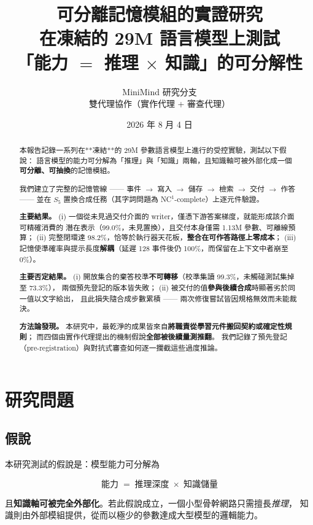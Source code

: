 \documentclass[11pt, a4paper]{article}
\title{\textbf{可分離記憶模組的實證研究}\\[4pt]
\large 在凍結的 29M 語言模型上測試\\
「能力 $=$ 推理 $\times$ 知識」的可分解性}
\author{MiniMind 研究分支\\\small 雙代理協作（實作代理 + 審查代理）}
\date{2026 年 8 月 4 日}
\begin{document}
\maketitle

\begin{abstract}
\noindent
本報告記錄一系列在**凍結**的 29M 參數語言模型上進行的受控實驗，測試以下假說：
語言模型的能力可分解為「推理」與「知識」兩軸，且知識軸可被外部化成一個
\textbf{可分離、可抽換}的記憶模組。

我們建立了完整的記憶管線 —— 事件 $\to$ 寫入 $\to$ 儲存 $\to$ 檢索 $\to$ 交付 $\to$ 作答 ——
並在 $S_5$ 置換合成任務（其字詞問題為 NC$^1$-complete）上逐元件驗證。

\textbf{主要結果。}
(i) 一個從未見過交付介面的 writer，僅憑下游答案梯度，就能形成該介面可精確消費的
潛在表示（99.0\%，未見置換），且交付本身僅需 1.13M 參數、可離線預算；
(ii) 完整閉環達 98.2\%，恰等於執行器天花板，\textbf{整合在可作答路徑上零成本}；
(iii) 記憶使準確率與提示長度\textbf{解耦}（延遲 128 事件後仍 100\%，而保留在上下文中者崩至 0\%）。

\textbf{主要否定結果。}
(i) 開放集合的棄答校準\textbf{不可轉移}（校準集讀 99.3\%，未觸碰測試集掉至 73.3\%），
兩個預先登記的版本皆失敗；
(ii) 被交付的值\textbf{參與後續合成}時顯著劣於同一值以文字給出，
且此損失隨合成步數累積 —— 兩次修復嘗試皆因規格無效而未能裁決。

\textbf{方法論發現。}
本研究中，最乾淨的成果皆來自\textbf{將職責從學習元件搬回契約或確定性規則}；
而四個由實作代理提出的機制假說\textbf{全部被後續量測推翻}。
我們記錄了預先登記（pre-registration）與對抗式審查如何逐一攔截這些過度推論。
\end{abstract}

\tableofcontents
\newpage

\section{研究問題}

\subsection{假說}

本研究測試的假說是：模型能力可分解為

\[
\text{能力} \;=\; \text{推理深度} \;\times\; \text{知識儲量}
\]

且\textbf{知識軸可被完全外部化}。若此假說成立，一個小型骨幹網路只需擅長\emph{推理}，
知識則由外部模組提供，從而以極少的參數達成大型模型的邏輯能力。
\end{document}
